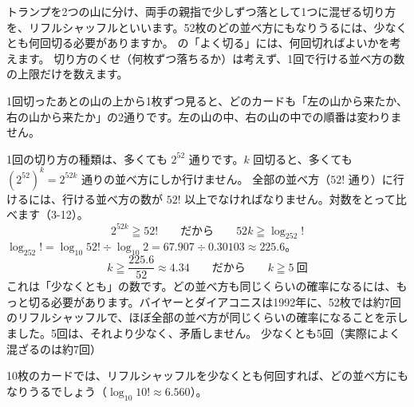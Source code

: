\label{ph:熱-15:ex12}
\begin{phreidai}
トランプを2つの山に分け、両手の親指で少しずつ落として1つに混ぜる切り方を、リフルシャッフルといいます。52枚のどの並べ方にもなりうるには、少なくとも何回切る必要がありますか。
\phbamen
\bkhatenaref の「よく切る」には、何回切ればよいかを考えます。
\phmushi
切り方のくせ（何枚ずつ落ちるか）は考えず、1回で行ける並べ方の数の上限だけを数えます。
\phzu
\noindent\begin{minipage}[c]{0.5\linewidth}\raggedright
1回切ったあとの山の上から1枚ずつ見ると、どのカードも「左の山から来たか、右の山から来たか」の2通りです。左の山の中、右の山の中での順番は変わりません。
\end{minipage}\hfill
\begin{minipage}[c]{0.46\linewidth}\centering
{}
\end{minipage}
\par\vspace{2pt}
1回の切り方の種類は、多くても $2^{52}$ 通りです。$k$ 回切ると、多くても $(2^{52})^k=2^{52k}$ 通りの並べ方にしか行けません。
\phriyu
全部の並べ方（$52!$ 通り）に行けるには、行ける並べ方の数が $52!$ 以上でなければなりません。対数をとって比べます（3-12）。
\phtateru
\[2^{52k}\geqq52!\qquad\text{だから}\qquad 52k\geqq\log_252!\]
\phtoku
$\log_252!=\log_{10}52!\div\log_{10}2=67.907\div0.30103\approx225.6$。
\[k\geqq\frac{225.6}{52}\approx4.34\qquad\text{だから}\qquad k\geqq5\ \text{回}\]
\phtashikame
これは「少なくとも」の数です。どの並べ方も同じくらいの確率になるには、もっと切る必要があります。バイヤーとダイアコニスは1992年に、52枚では約7回のリフルシャッフルで、ほぼ全部の並べ方が同じくらいの確率になることを示しました。5回は、それより少なく、矛盾しません。
\kotae 少なくとも5回（実際によく混ざるのは約7回）
\end{phreidai}
\begin{jibun}
10枚のカードでは、リフルシャッフルを少なくとも何回すれば、どの並べ方にもなりうるでしょう（$\log_{10}10!\approx6.560$）。
\end{jibun}

